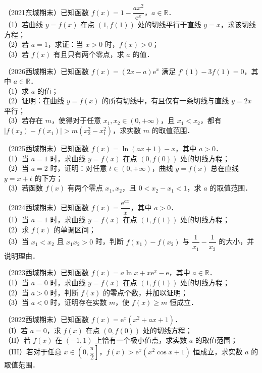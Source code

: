 \begin{example}
（2021东城期末）已知函数 $f(x)=1-\dfrac{ax^2}{\mathrm{e}^x}$，$a\in\mathbb{R}$．\\
（1）若曲线 $y=f(x)$ 在点 $(1,f(1))$ 处的切线平行于直线 $y=x$，求该切线方程；\\
（2）若 $a=1$，求证：当 $x>0$ 时，$f(x)>0$；\\
（3）若 $f(x)$ 有且只有两个零点，求 $a$ 的值．
\end{example}

\begin{example}
（2026西城期末）已知函数 $f(x)=(2x-a)\mathrm{e}^x$ 满足 $f'(1)-3f(1)=0$，其中 $a\in\mathbb{R}$．\\
（1）求 $a$ 的值；\\
（2）证明：在曲线 $y=f(x)$ 的所有切线中，有且仅有一条切线与直线 $y=2x$ 平行；\\
（3）若存在 $m$，使得对于任意 $x_1,x_2\in(0,+\infty)$，且 $x_1<x_2$，都有 $|f(x_2)-f(x_1)|>m(x_2^2-x_1^2)$，求实数 $m$ 的取值范围．
\end{example}

\begin{example}
（2025西城期末）已知函数 $f(x)=\ln(ax+1)-x$，其中 $a>0$．\\
（1）当 $a=1$ 时，求曲线 $y=f(x)$ 在点 $(0,f(0))$ 处的切线方程；\\
（2）当 $a=2$ 时，证明：对任意 $t\in(0,+\infty)$，曲线 $y=f(x)$ 总在直线 $y=x+t$ 的下方；\\
（3）若函数 $f(x)$ 有两个零点 $x_1,x_2$，且 $0<x_2-x_1<1$，求 $a$ 的取值范围．
\end{example}

\begin{example}
（2024西城期末）已知函数 $f(x)=\dfrac{\mathrm{e}^{ax}}{x}$，其中 $a>0$．\\
（1）当 $a=1$ 时，求曲线 $y=f(x)$ 在点 $(1,f(1))$ 处的切线方程；\\
（2）求 $f(x)$ 的单调区间；\\
（3）当 $x_1<x_2$ 且 $x_1x_2>0$ 时，判断 $f(x_1)-f(x_2)$ 与 $\dfrac1{x_1}-\dfrac1{x_2}$ 的大小，并说明理由．
\end{example}

\begin{example}
（2023西城期末）已知函数 $f(x)=a\ln x+x\mathrm{e}^x-\mathrm{e}$，其中 $a\in\mathbb{R}$．\\
（1）当 $a=0$ 时，求曲线 $y=f(x)$ 在点 $(1,f(1))$ 处的切线方程；\\
（2）当 $a>0$ 时，判断 $f(x)$ 的零点个数，并加以证明；\\
（3）当 $a<0$ 时，证明存在实数 $m$，使 $f(x)\geqslant m$ 恒成立．
\end{example}
\begin{example}
（2022西城期末）已知函数 $f(x)=\mathrm{e}^x(x^2+ax+1)$．\\
（I）若 $a=0$，求 $f(x)$ 在点 $(0,f(0))$ 处的切线方程；\\
（II）若 $f(x)$ 在 $(-1,1)$ 上恰有一个极小值点，求实数 $a$ 的取值范围；\\
（III）若对于任意 $x\in\left(0,\dfrac{\pi}{2}\right]$，$f(x)>\mathrm{e}^x(x^2\cos x+1)$ 恒成立，求实数 $a$ 的取值范围．
\end{example}


